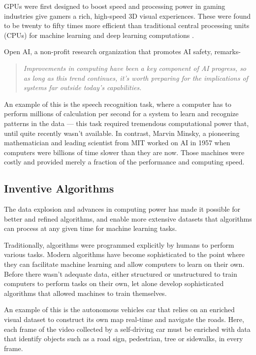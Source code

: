 GPUs were first designed to boost speed and processing power in gaming industries give gamers a rich, high-speed 3D visual experiences. These were found to be twenty to fifty times more efficient than traditional central processing units (CPUs) for machine learning and deep learning computations \cite{Yosinski2015}.

Open AI, a non-profit research organization that promotes AI safety, remarks- \begin{quote}
    \textit{Improvements in computing have been a key component of AI progress, so as long as this trend continues, it’s worth preparing for the implications of systems far outside today’s capabilities.}
\end{quote}

An example of this is the speech recognition task, where a computer has to perform millions of calculation per second for a system to learn and recognize patterns in the data — this task required tremendous computational power that, until quite recently wasn't available. In contrast, Marvin Minsky, a pioneering mathematician and leading scientist from MIT worked on AI in 1957 when computers were billions of time slower than they are now. Those machines were costly and provided merely a fraction of the performance and computing speed.

\subsection{Inventive Algorithms}
The data explosion and advances in computing power has made it possible for better and refined algorithms, and enable more extensive datasets that algorithms can process at any given time for machine learning tasks. 

Traditionally, algorithms were programmed explicitly by humans to perform various tasks. Modern algorithms have become sophisticated to the point where they can facilitate machine learning and allow computers to learn on their own. Before there wasn’t adequate data, either structured or unstructured to train computers to perform tasks on their own, let alone develop sophisticated algorithms that allowed machines to train themselves. 

An example of this is the autonomous vehicles car that relies on an enriched visual dataset to construct its own map real-time and navigate the roads. Here, each frame of the video collected by a self-driving car must be enriched with data that identify objects such as a road sign, pedestrian, tree or sidewalks, in every frame.

